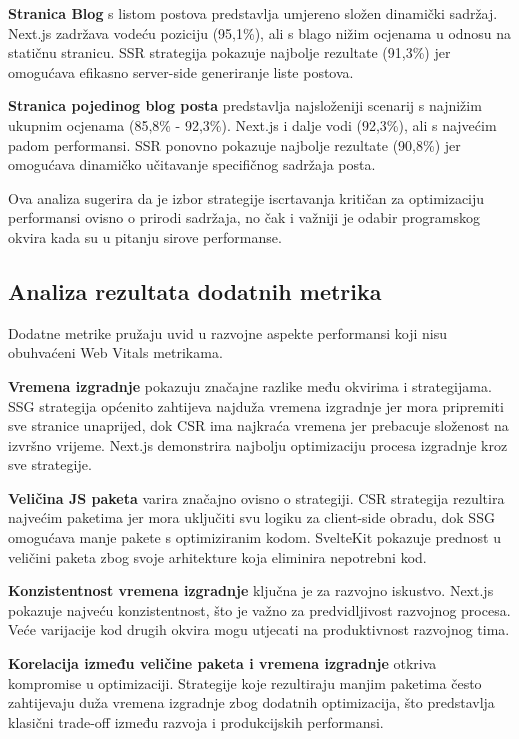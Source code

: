 \textbf{Stranica Blog} s listom postova predstavlja umjereno složen dinamički sadržaj. Next.js zadržava vodeću poziciju (95,1\%), ali s blago nižim ocjenama u odnosu na statičnu stranicu. SSR strategija pokazuje najbolje rezultate (91,3\%) jer omogućava efikasno server-side generiranje liste postova.

\textbf{Stranica pojedinog blog posta} predstavlja najsloženiji scenarij s najnižim ukupnim ocjenama (85,8\% - 92,3\%). Next.js i dalje vodi (92,3\%), ali s najvećim padom performansi. SSR ponovno pokazuje najbolje rezultate (90,8\%) jer omogućava dinamičko učitavanje specifičnog sadržaja posta.

\bigskip
Ova analiza sugerira da je izbor strategije iscrtavanja kritičan za optimizaciju performansi ovisno o prirodi sadržaja, no čak i važniji je odabir programskog okvira kada su u pitanju sirove performanse.

\subsection{Analiza rezultata dodatnih metrika}

Dodatne metrike pružaju uvid u razvojne aspekte performansi koji nisu obuhvaćeni Web Vitals metrikama.

\textbf{Vremena izgradnje} pokazuju značajne razlike među okvirima i strategijama. SSG strategija općenito zahtijeva najduža vremena izgradnje jer mora pripremiti sve stranice unaprijed, dok CSR ima najkraća vremena jer prebacuje složenost na izvršno vrijeme. Next.js demonstrira najbolju optimizaciju procesa izgradnje kroz sve strategije.

\textbf{Veličina JS paketa} varira značajno ovisno o strategiji. CSR strategija rezultira najvećim paketima jer mora uključiti svu logiku za client-side obradu, dok SSG omogućava manje pakete s optimiziranim kodom. SvelteKit pokazuje prednost u veličini paketa zbog svoje arhitekture koja eliminira nepotrebni kod.

\textbf{Konzistentnost vremena izgradnje} ključna je za razvojno iskustvo. Next.js pokazuje najveću konzistentnost, što je važno za predvidljivost razvojnog procesa. Veće varijacije kod drugih okvira mogu utjecati na produktivnost razvojnog tima.

\textbf{Korelacija između veličine paketa i vremena izgradnje} otkriva kompromise u optimizaciji. Strategije koje rezultiraju manjim paketima često zahtijevaju duža vremena izgradnje zbog dodatnih optimizacija, što predstavlja klasični trade-off između razvoja i produkcijskih performansi.

